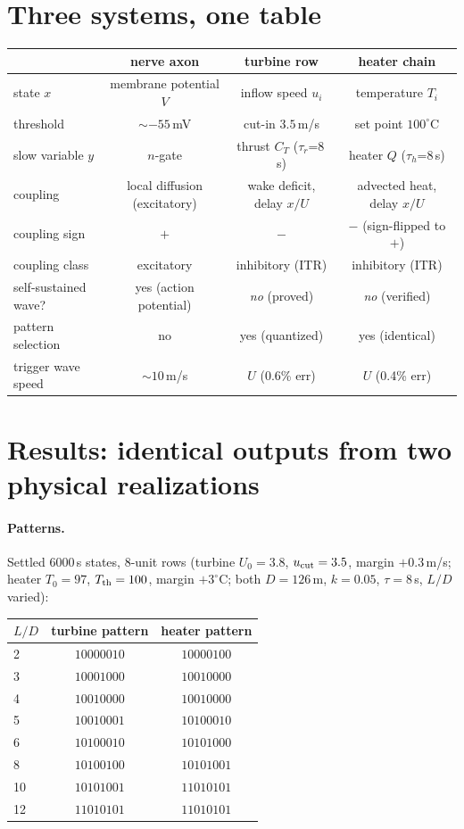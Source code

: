 \documentclass[11pt]{article}
\begin{document}
\section{Three systems, one table}

\begin{center}\small
\begin{tabular}{lccc}
\toprule
 & \textbf{nerve axon} & \textbf{turbine row} & \textbf{heater chain}\\
\midrule
state $x$ & membrane potential $V$ & inflow speed $u_i$ & temperature $T_i$\\
threshold & $\sim -55$\,mV & cut-in $3.5$\,m/s & set point $100^\circ$C\\
slow variable $y$ & $n$-gate & thrust $C_T$ ($\tau_r$=8\,s) & heater $Q$ ($\tau_h$=8\,s)\\
coupling & local diffusion (excitatory) & wake deficit, delay $x/U$ & advected heat, delay $x/U$\\
coupling sign & $+$ & $-$ & $-$ (sign-flipped to $+$)\\
coupling class & excitatory & inhibitory (ITR) & inhibitory (ITR)\\
self-sustained wave? & yes (action potential) & \emph{no} (proved) & \emph{no} (verified)\\
pattern selection & no & yes (quantized) & yes (identical)\\
trigger wave speed & $\sim 10$\,m/s & $U$ (0.6\% err) & $U$ (0.4\% err)\\
\bottomrule
\end{tabular}
\end{center}

\section{Results: identical outputs from two physical realizations}

\paragraph{Patterns.} Settled $6000$\,s states, 8-unit rows (turbine $U_0=3.8$, $u_{\rm
cut}=3.5$, margin $+0.3$\,m/s; heater $T_0=97$, $T_{\rm th}=100$, margin $+3^\circ$C; both
$D=126$\,m, $k=0.05$, $\tau=8$\,s, $L/D$ varied):

\begin{center}\small
\begin{tabular}{lcc}
\toprule
$L/D$ & turbine pattern & heater pattern\\
\midrule
2 & $10000010$ & $10000100$\\
3 & $10001000$ & $10010000$\\
4 & $10010000$ & $10010000$\\
5 & $10010001$ & $10100010$\\
6 & $10100010$ & $10101000$\\
8 & $10100100$ & $10101001$\\
10 & $10101001$ & $11010101$\\
12 & $11010101$ & $11010101$\\
\bottomrule
\end{tabular}
\end{center}
\end{document}
